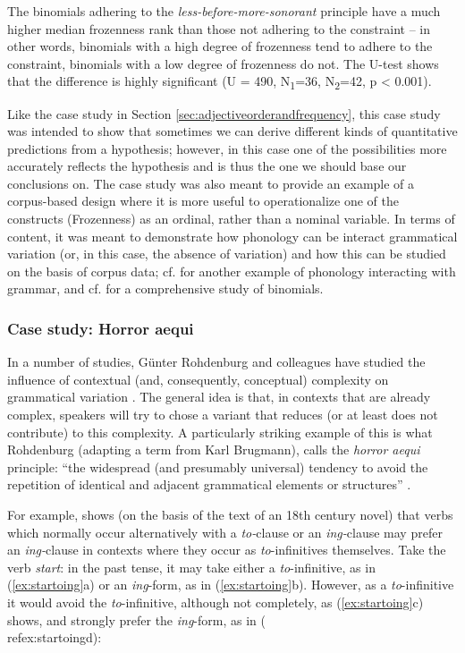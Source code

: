 The binomials adhering to the \textit{less-before-more-sonorant} principle have a much higher median frozenness rank than those not adhering to the constraint -- in other words, binomials with a high degree of frozenness tend to adhere to the constraint, binomials with a low degree of frozenness do not. The U-test shows that the difference is highly significant (U = 490, N\textsubscript{1}=36, N\textsubscript{2}=42, p < 0.001).

Like the case study in Section \ref{sec:adjectiveorderandfrequency}, this case study was intended to show that sometimes we can derive different kinds of quantitative predictions from a hypothesis; however, in this case one of the possibilities more accurately reflects the hypothesis and is thus the one we should base our conclusions on. The case study was also meant to provide an example of a corpus-based design where it is more useful to operationalize one of the constructs (Frozenness) as an ordinal, rather than a nominal variable. In terms of content, it was meant to demonstrate how phonology can be interact grammatical variation (or, in this case, the absence of variation) and how this can be studied on the basis of corpus data; cf. \citet{rohdenburg_phonological_2003} for another example of phonology interacting with grammar, and cf. \citet{lohmann_constituent_2013} for a comprehensive study of binomials.

\subsubsection{Case study: Horror aequi}
\label{sec:horroraequi}

In a number of studies, G\"{u}nter Rohdenburg and colleagues have studied the influence of contextual (and, consequently, conceptual) complexity on grammatical variation \citep[e.g.]{rohdenburg_replacement_1995, rohdenburg_cognitive_2003}. The general idea is that, in contexts that are already complex, speakers will try to chose a variant that reduces (or at least does not contribute) to this complexity. A particularly striking example of this is what Rohdenburg (adapting a term from Karl Brugmann), calls the \textit{horror aequi} principle: ``the widespread (and presumably universal) tendency to avoid the repetition of identical and adjacent grammatical elements or structures'' \citep[206]{rohdenburg_cognitive_2003}.

For example, \citet[380]{rohdenburg_replacement_1995} shows (on the basis of the text of an 18th century novel) that verbs which normally occur alternatively with a \textit{to-}clause or an \textit{ing-}clause may prefer an \textit{ing-}clause in contexts where they occur as \textit{to}-infinitives themselves. Take the verb \textit{start}: in the past tense, it may take either a \textit{to}-infinitive, as in (\ref{ex:startoing}a) or an \textit{ing}-form, as in (\ref{ex:startoing}b). However, as a \textit{to}-infinitive it would avoid the \textit{to}-infinitive, although not completely, as (\ref{ex:startoing}c) shows, and strongly prefer the \textit{ing}-form, as in (\\ref{ex:startoing}d):

